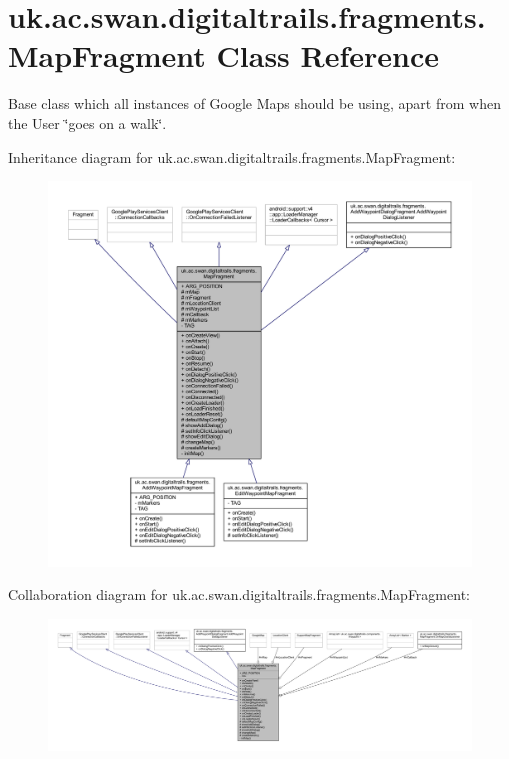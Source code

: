 \hypertarget{classuk_1_1ac_1_1swan_1_1digitaltrails_1_1fragments_1_1_map_fragment}{\section{uk.\+ac.\+swan.\+digitaltrails.\+fragments.\+Map\+Fragment Class Reference}
\label{classuk_1_1ac_1_1swan_1_1digitaltrails_1_1fragments_1_1_map_fragment}
}


Base class which all instances of Google Maps should be using, apart from when the User \char`\"{}goes on a walk\char`\"{}.  




Inheritance diagram for uk.\+ac.\+swan.\+digitaltrails.\+fragments.\+Map\+Fragment\+:
\nopagebreak
\begin{figure}[H]
\begin{center}
\leavevmode
\includegraphics[width=350pt]{classuk_1_1ac_1_1swan_1_1digitaltrails_1_1fragments_1_1_map_fragment__inherit__graph}
\end{center}
\end{figure}


Collaboration diagram for uk.\+ac.\+swan.\+digitaltrails.\+fragments.\+Map\+Fragment\+:
\nopagebreak
\begin{figure}[H]
\begin{center}
\leavevmode
\includegraphics[width=350pt]{classuk_1_1ac_1_1swan_1_1digitaltrails_1_1fragments_1_1_map_fragment__coll__graph}
\end{center}
\end{figure}
